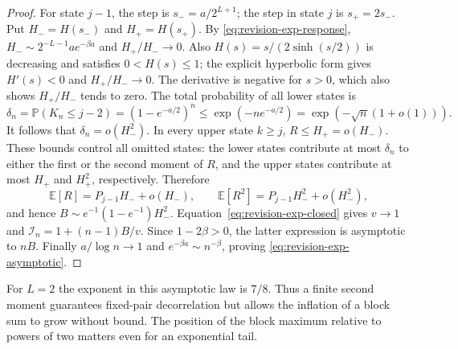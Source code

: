 \begin{proof}
For state $j-1$, the step is $s_-=a/2^{L+1}$; the step in state $j$ is
$s_+=2s_-$. Put $H_-=H(s_-)$ and $H_+=H(s_+)$. By
\eqref{eq:revision-exp-response},
$H_-\sim2^{-L-1}a e^{-\beta a}$ and $H_+/H_-\to0$.
Also $H(s)=s/(2\sinh(s/2))$ is decreasing and satisfies $0<H(s)\le1$;
the explicit hyperbolic form gives $H'(s)<0$ and $H_+/H_-\to0$.
The derivative is negative for $s>0$, which also shows $H_+/H_-$ tends to zero.
The total probability of all lower states is
\[
 \delta_n=\mathbb P(K_n\le j-2)
       =(1-e^{-a/2})^n\le \exp(-ne^{-a/2})
       =\exp(-\sqrt n(1+o(1))).
\]
It follows that $\delta_n=o(H_-^2)$. In every upper state $k\ge j$,
$R\le H_+=o(H_-)$. These bounds control all omitted states: the lower
states contribute at most $\delta_n$ to either the first or the second
moment of $R$, and the upper states contribute at most $H_+$ and $H_+^2$,
respectively. Therefore
\[
 \mathbb E[R]=P_{j-1}H_-+o(H_-),\qquad
 \mathbb E[R^2]=P_{j-1}H_-^2+o(H_-^2),
\]
and hence
$B\sim e^{-1}(1-e^{-1})H_-^2$.
Equation~\eqref{eq:revision-exp-closed} gives $v\to1$ and
$\mathcal I_n=1+(n-1)B/v$. Since $1-2\beta>0$,
the latter expression is asymptotic to $nB$.
Finally $a/\log n\to1$ and $e^{-\beta a}\sim n^{-\beta}$, proving
\eqref{eq:revision-exp-asymptotic}.
\end{proof}

For $L=2$ the exponent in this asymptotic law is $7/8$. Thus a finite second
moment guarantees fixed-pair decorrelation but allows the inflation of a
block sum to grow without bound. The position of the block maximum relative
to powers of two matters even for an exponential tail.
